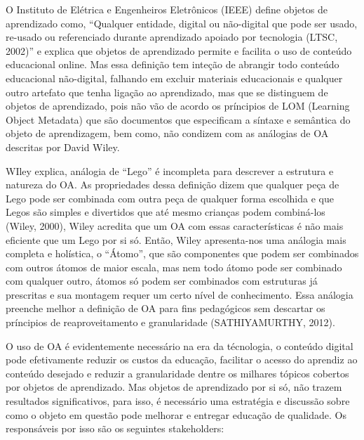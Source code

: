 \documentclass[12pt,openright,oneside,a4paper,english,french,spanish,brazil]{unifil}
\begin{document}
\par O Instituto de Elétrica e Engenheiros Eletrônicos (IEEE)  define objetos de aprendizado como, ``Qualquer entidade, digital ou não-digital que pode ser usado, re-usado ou referenciado durante aprendizado apoiado por tecnologia (LTSC, 2002)'' e explica que objetos de aprendizado permite e facilita o uso de conteúdo educacional online. Mas essa definição tem inteção de abrangir todo conteúdo educacional não-digital, falhando em excluir materiais educacionais e qualquer outro artefato que tenha ligação ao aprendizado, mas que se distinguem de objetos de aprendizado, pois não vão de acordo os príncipios de LOM (Learning Object Metadata) que são documentos que especificam a síntaxe e semântica do objeto de aprendizagem, bem como, não condizem com as análogias de OA descritas por David Wiley.
\par WIley explica, análogia de ``Lego'' é incompleta para descrever a estrutura e natureza do OA. As propriedades dessa definição dizem que qualquer peça de Lego pode ser combinada com outra peça de qualquer forma escolhida e que Legos são simples e divertidos que até mesmo crianças podem combiná-los (Wiley, 2000), Wiley acredita que um OA com essas características é não mais eficiente que um Lego por si só. Então, Wiley apresenta-nos uma análogia mais completa e holística, o ``Átomo'', que são componentes que podem ser combinados com outros átomos de maior escala, mas nem todo átomo pode ser combinado com qualquer outro, átomos só podem ser combinados com estruturas já prescritas e sua montagem requer um certo nível de conhecimento. Essa análogia preenche melhor a definição de OA para fins pedagógicos sem descartar os príncipios de reaproveitamento e granularidade (\uppercase{Sathiyamurthy}, 2012).

O uso de OA é evidentemente necessário na era da técnologia, o conteúdo digital pode efetivamente reduzir os custos da educação, facilitar o acesso do aprendiz ao conteúdo desejado e reduzir a granularidade dentre os milhares tópicos cobertos por objetos de aprendizado.
Mas objetos de aprendizado por si só, não trazem resultados significativos, para isso, é necessário uma estratégia e discussão sobre como o objeto em questão pode melhorar e entregar educação de qualidade. Os responsáveis por isso são os seguintes stakeholders:
\end{document}
